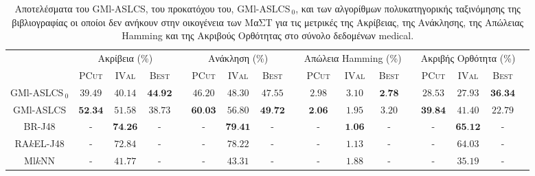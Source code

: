 \begin{landscape}
\begin{table}
\begin{center}
\caption[Αποτελέσματα στο σύνολο δεδομένων medical.]{Αποτελέσματα του GMl-ASLCS, του προκατόχου του, GMl-ASLCS$_{\:0}$, και των αλγορίθμων πολυκατηγορικής ταξινόμησης της βιβλιογραφίας οι οποίοι δεν ανήκουν στην οικογένεια των ΜαΣΤ για τις μετρικές της Ακρίβειας, της Ανάκλησης, της Απώλειας Hamming και της Ακριβούς Ορθότητας στο σύνολο δεδομένων medical.}
\label{table:medicalEvals}
\begin{tabular}{ccccccccccccccccc}
 & \multicolumn{3}{c}{Ακρίβεια (\%)} & & \multicolumn{3}{c}{Ανάκληση (\%)} & & \multicolumn{3}{c}{Απώλεια Hamming (\%)} & & \multicolumn{3}{c}{Ακριβής Ορθότητα (\%)}
\\ 
\cline{2-4} \cline{6-8} \cline{10-12} \cline{14-16}
& \textsc{PCut} & \textsc{IVal} & \textsc{Best} & & \textsc{PCut} & \textsc{IVal} & \textsc{Best} & & \textsc{PCut} & \textsc{IVal} & \textsc{Best} & & \textsc{PCut} & \textsc{IVal} & \textsc{Best}\\ \hline
GMl-ASLCS$_{\:0}$ & $39.49$ & $40.14$ & $\textbf{44.92}$ & & $46.20$ & $48.30$ & $47.55$ & & $2.98$ & $3.10$ & $\textbf{2.78}$ & & $28.53$ & $27.93$ & $\textbf{36.34}$ \\ 
GMl-ASLCS 		  & $\textbf{52.34}$ & $51.58$ & $38.73$ & & $\textbf{60.03}$ & $56.80$ & $\textbf{49.72}$ & & $\textbf{2.06}$	& $1.95$ & $3.20$	& & $\textbf{39.84}$ & $41.40$	& $22.79$ \\
\hline
\hline
BR-J48 			  & - & $\textbf{74.26}$ & - & & - & $\textbf{79.41}$ & - & & -	& $\textbf{1.06}$ & -	& & - & $\textbf{65.12}$	& - \\
RA$k$EL-J48 	  & - & $72.84$ & - & & - & $78.22$ & - & & -	& $1.13$ & -	& & - & $64.03$	& - \\
Ml$k$NN 		  & - & $41.77$ & - & & - & $43.31$ & - & & -	& $1.88$ & -	& & - & $35.19$	& - \\
\hline

\end{tabular} 
\end{center}
\end{table}



\end{landscape}
